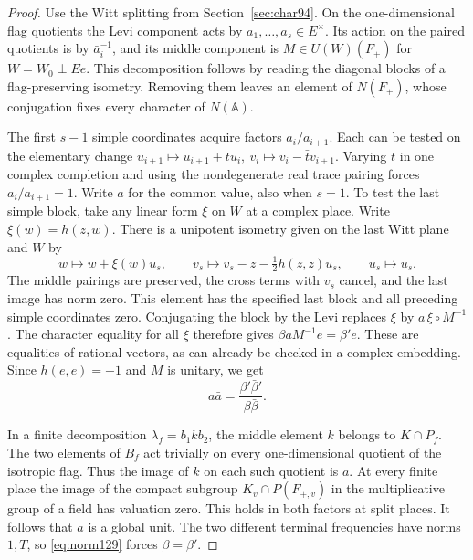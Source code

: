 \documentclass[a4paper,11pt]{article}
\theoremstyle{definition}
\theoremstyle{remark}
\numberwithin{equation}{section}
\begin{document}
\begin{proof}
Use the Witt splitting from Section~\ref{sec:char94}. On the
one-dimensional flag quotients the Levi component acts by
\(a_1,\ldots,a_s\in E^\times\). Its action on the paired quotients
is by \(\bar a_i^{-1}\), and its middle component is \(M\in U(W)(F_+)\)
for \(W=W_0\perp Ee\). This decomposition follows by reading the
diagonal blocks of a flag-preserving isometry. Removing them leaves
an element of \(N(F_+)\), whose conjugation fixes every character
of \(N(\mathbb A)\).

The first \(s-1\) simple coordinates acquire factors \(a_i/a_{i+1}\).
Each can be tested on the elementary change
\(u_{i+1}\mapsto u_{i+1}+t u_i,\ v_i\mapsto v_i-\bar t v_{i+1}\).
Varying \(t\) in one complex completion and using the nondegenerate
real trace pairing forces \(a_i/a_{i+1}=1\). Write \(a\) for the
common value, also when \(s=1\).
To test the last simple block, take any linear form \(\xi\) on
\(W\) at a complex place. Write \(\xi(w)=h(z,w)\). There is a
unipotent isometry given on the last Witt plane and \(W\) by
\[
 w\longmapsto w+\xi(w)u_s,\qquad
 v_s\longmapsto v_s-z-\tfrac12 h(z,z)u_s,\qquad u_s\longmapsto u_s.
\]
The middle pairings are preserved, the cross terms with \(v_s\)
cancel, and the last image has norm zero. This element has the
specified last block and all preceding simple coordinates zero.
Conjugating the block by the Levi replaces \(\xi\) by
\(a\,\xi\circ M^{-1}\). The character equality for all \(\xi\)
therefore gives \(\beta a M^{-1}e=\beta'e\). These are equalities
of rational vectors, as can already be checked in a complex
embedding. Since \(h(e,e)=-1\) and \(M\) is unitary, we get
\begin{equation}
            a\bar a=\frac{\beta'\bar\beta'}{\beta\bar\beta}.
            \label{eq:norm129}
\end{equation}

In a finite decomposition \(\lambda_f=b_1 k b_2\), the middle
element \(k\) belongs to \(K\cap P_f\). The two elements of \(B_f\)
act trivially on every one-dimensional quotient of the isotropic
flag. Thus the image of \(k\) on each such quotient is \(a\).
At every finite place the image of the compact subgroup
\(K_v\cap P(F_{+,v})\) in the multiplicative group of a field has
valuation zero. This holds in both factors at split places.
It follows that \(a\) is a global unit. The two different terminal
frequencies have norms \(1,T\), so \eqref{eq:norm129} forces
\(\beta=\beta'\).


\end{proof}
\end{document}

